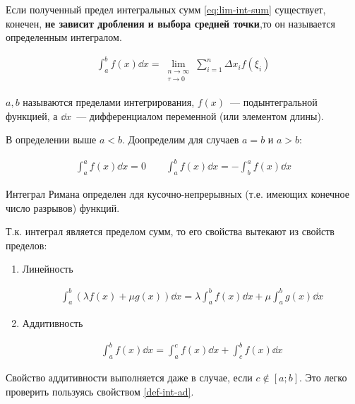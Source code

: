 \begin{definition}
  Если полученный предел интегральных сумм \eqref{eq:lim-int-sum} существует,
  конечен, \textbf{не зависит дробления и выбора средней точки},то он называется
  определенным интегралом.

  \begin{align*}
    \int_{a}^{b} f(x) \dd x = \lim_{\substack{n \to \infty \\ \tau \to 0}}
      \sum_{i = 1}^{n} \Delta x_{i} f(\xi_{i})
  \end{align*}

  \(a, b\) называются пределами интегрирования, \(f(x)\)~--- подынтегральной
  функцией, а \(\dd x\)~--- дифференциалом переменной (или элементом длины).
\end{definition}

\begin{remark}\label{def-int-ad}
  В определении выше \(a < b\). Доопределим для случаев \(a = b\) и \(a > b\):

  \begin{align*}
    \int_{a}^{a} f(x) \dd x = 0 \qquad
    \int_{a}^{b} f(x) \dd x = -\int_{b}^{a} f(x) \dd x
  \end{align*}
\end{remark}

\begin{remark}
  Интеграл Римана определен лдя кусочно-непрерывных (т.е. имеющих конечное
  число разрывов) функций.
\end{remark}

Т.к. интеграл является пределом сумм, то его свойства вытекают из свойств
пределов:
\begin{enumerate}
  \item Линейность
  
  \begin{align*}
    \int_{a}^{b} (\lambda f(x) + \mu g(x)) \dd x =
    \lambda \int_{a}^{b} f(x) \dd x + \mu \int_{a}^{b} g(x) \dd x
  \end{align*}

  \item Аддитивность
  
  \begin{align*}
    \int_{a}^{b} f(x) \dd x =
    \int_{a}^{c} f(x) \dd x + \int_{c}^{b} f(x) \dd x
  \end{align*}
\end{enumerate}

\begin{remark}
  Свойство аддитивности выполняется даже в случае, если \(c \notin [a;b]\). Это
  легко проверить пользуясь свойством \ref{def-int-ad}.
\end{remark}